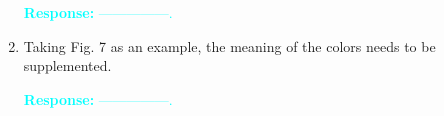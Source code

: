 \documentclass[11pt,a2paper]{report}
\begin{document}
\begin{enumerate}
	\textcolor{Cyan}{
		\textbf{Response:}
		---------------.
	}
	
	\item Taking Fig. 7 as an example, the meaning of the colors needs to be 
	supplemented.
	
	\textcolor{Cyan}{
		\textbf{Response:}
		---------------.
	}	
	
\end{enumerate}	
\end{document}
